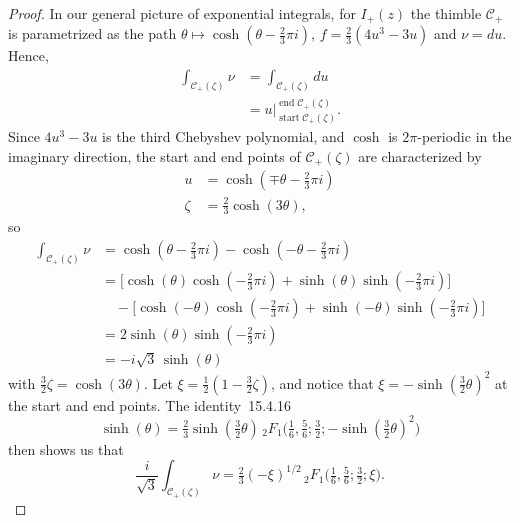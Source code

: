 \documentclass{article}
\theoremstyle{definition}
\begin{document}
\begin{proof}
In our general picture of exponential integrals, for $I_+(z)$ the thimble $\mathcal{C}_+$ is parametrized as the path $\theta \mapsto \cosh(\theta - \tfrac{2}{3}\pi i)$, $f = \tfrac{2}{3}(4u^3 - 3u)$ and $\nu = du$. Hence,
\begin{align*}
\int_{\mathcal{C}_+(\zeta)} \nu & = \int_{\mathcal{C}_+(\zeta)} du \\
& = u \Big|_{\operatorname{start} \mathcal{C}_+(\zeta)}^{\operatorname{end} \mathcal{C}_+(\zeta)}.
\end{align*}
Since $4u^3 - 3u$ is the third Chebyshev polynomial, and $\cosh$ is $2\pi$-periodic in the imaginary direction, the start and end points of $\mathcal{C}_+(\zeta)$ are characterized by
\begin{align*}
u & = \cosh(\mp\theta - \tfrac{2}{3}\pi i) \\
\zeta & = \tfrac{2}{3} \cosh(3\theta),
\end{align*}
so
\begin{align*}
\int_{\mathcal{C}_+(\zeta)} \nu & = \cosh(\theta - \tfrac{2}{3}\pi i) - \cosh(-\theta - \tfrac{2}{3}\pi i) \\
& = \big[\cosh(\theta) \cosh(-\tfrac{2}{3}\pi i) + \sinh(\theta) \sinh(-\tfrac{2}{3}\pi i)\big] \\
& \quad - \big[\cosh(-\theta) \cosh(-\tfrac{2}{3}\pi i) + \sinh(-\theta) \sinh(-\tfrac{2}{3}\pi i)\big] \\
& = 2\sinh(\theta) \sinh(-\tfrac{2}{3}\pi i) \\
& = -i\sqrt{3}\,\sinh(\theta)
\end{align*}
with $\tfrac{3}{2} \zeta = \cosh(3\theta)$. Let $\xi = \tfrac{1}{2}(1 - \tfrac{3}{2}\zeta)$, and notice that $\xi = -\sinh(\tfrac{3}{2} \theta)^2$ at the start and end points. The identity~15.4.16 \cite{dlmf}
\[ \sinh(\theta) = \tfrac{2}{3} \sinh(\tfrac{3}{2} \theta)\,{}_2F_1\big(\tfrac{1}{6}, \tfrac{5}{6}; \tfrac{3}{2}; -\sinh(\tfrac{3}{2} \theta)^2\big) \]
then shows us that
\[ \frac{i}{\sqrt{3}} \int_{\mathcal{C}_+(\zeta)} \nu = \tfrac{2}{3} (-\xi)^{1/2}\,{}_2F_1\big(\tfrac{1}{6}, \tfrac{5}{6}; \tfrac{3}{2}; \xi\big). \]


\end{proof}
\end{document}

